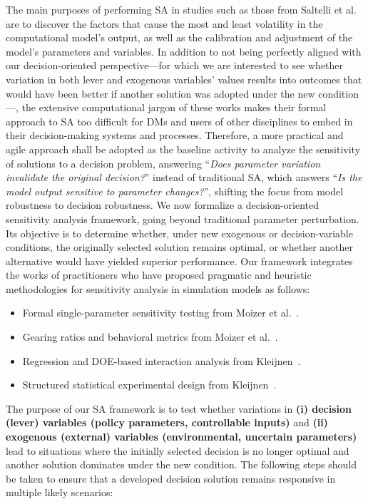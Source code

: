 \documentclass{sfuthesis}
\begin{document}
The main purposes of performing SA in studies such as those from Saltelli et al.~\cite{saltelli2000sensitivity,saltelli2008global} are to discover the factors that cause the most and least volatility in the computational model’s output, as well as the calibration and adjustment of the model’s parameters and variables. In addition to not being perfectly aligned with our decision-oriented perspective—for which we are interested to see whether variation in both lever and exogenous variables’ values results into outcomes that would have been better if another solution was adopted under the new condition—, the extensive computational jargon of these works makes their formal approach to SA too difficult for DMs and users of other disciplines to embed in their decision-making systems and processes. Therefore, a more practical and agile approach shall be adopted as the baseline activity to analyze the sensitivity of solutions to a decision problem, answering “\textit{Does parameter variation invalidate the original decision?}” instead of traditional SA, which answers “\textit{Is the model output sensitive to parameter changes?}”, shifting the focus from model robustness to decision robustness. We now formalize a decision-oriented sensitivity analysis framework, going beyond traditional parameter perturbation. Its objective is to determine whether, under new exogenous or decision-variable conditions, the originally selected solution remains optimal, or whether another alternative would have yielded superior performance. Our framework integrates the works of practitioners who have proposed pragmatic and heuristic methodologies for sensitivity analysis in simulation models as follows:
\begin{itemize}
    \item Formal single-parameter sensitivity testing from Moizer et al.~\cite{moizer2001formal}.
    \item Gearing ratios and behavioral metrics from Moizer et al.~\cite{moizer2001formal}.
    \item Regression and DOE-based interaction analysis from Kleijnen~\cite{kleijnen1995sensitivity}.
    \item Structured statistical experimental design from Kleijnen~\cite{kleijnen1995sensitivity}.
\end{itemize}
The purpose of our SA framework is to test whether variations in \textbf{(i) decision (lever) variables (policy parameters, controllable inputs)} and \textbf{(ii) exogenous (external) variables (environmental, uncertain parameters)} lead to situations where the initially selected decision is no longer optimal and another solution dominates under the new condition. The following steps should be taken to ensure that a developed decision solution remains responsive in multiple likely scenarios:\par
\end{document}
